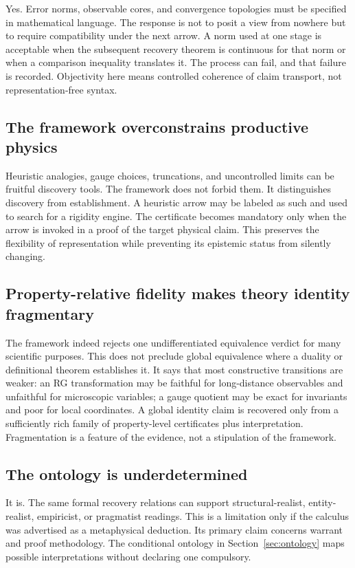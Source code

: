 Yes.  Error norms, observable cores, and convergence topologies must be
specified in mathematical language.  The response is not to posit a view
from nowhere but to require compatibility under the next arrow.  A norm used
at one stage is acceptable when the subsequent recovery theorem is continuous
for that norm or when a comparison inequality translates it.  The process can
fail, and that failure is recorded.  Objectivity here means controlled
coherence of claim transport, not representation-free syntax.

\subsection{The framework overconstrains productive physics}

Heuristic analogies, gauge choices, truncations, and uncontrolled limits can
be fruitful discovery tools.  The framework does not forbid them.  It
distinguishes discovery from establishment.  A heuristic arrow may be labeled
as such and used to search for a rigidity engine.  The certificate becomes
mandatory only when the arrow is invoked in a proof of the target physical
claim.  This preserves the flexibility of representation while preventing
its epistemic status from silently changing.

\subsection{Property-relative fidelity makes theory identity fragmentary}

The framework indeed rejects one undifferentiated equivalence verdict for
many scientific purposes.  This does not preclude global equivalence where a
duality or definitional theorem establishes it.  It says that most
constructive transitions are weaker: an RG transformation may be faithful for
long-distance observables and unfaithful for microscopic variables; a gauge
quotient may be exact for invariants and poor for local coordinates.  A global
identity claim is recovered only from a sufficiently rich family of
property-level certificates plus interpretation.  Fragmentation is a feature
of the evidence, not a stipulation of the framework.

\subsection{The ontology is underdetermined}

It is.  The same formal recovery relations can support structural-realist,
entity-realist, empiricist, or pragmatist readings.  This is a limitation only
if the calculus was advertised as a metaphysical deduction.  Its primary
claim concerns warrant and proof methodology.  The conditional ontology in
Section~\ref{sec:ontology} maps possible interpretations without declaring
one compulsory.

